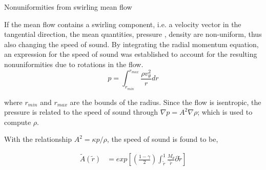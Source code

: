 \begin{frame}{Nonuniformities from swirling mean flow}
    

If the mean flow contains a swirling component, i.e. a velocity vector in the 
tangential direction, the mean quantities, pressure , density are non-uniform, 
thus also changing the speed of sound. By integrating the radial momentum
equation, an expression for the speed of sound was established to account for 
the resulting nonuniformities due to rotations in the flow. 
\begin{equation}
    p = \int_{r_{min}}^{r_{max}} \frac{\rho v_{\theta}^2}{r} dr 
    \label{eqn:radialmomentum_integrated}
\end{equation}

where $r_{min}$ and $r_{max}$ are the bounds of the radius. Since the flow
is isentropic, the pressure is related to the speed of sound through $\nabla p =
A^2 \nabla \rho$; which is used to compute $\rho$. 

\end{frame}
\begin{frame}

With the relationship 
$A^2 = \kappa p/\rho$, the speed of sound is found to be,

    
\begin{align*}
\tilde{A}(\tilde{r}) &= exp\left[\left(\frac{1 - \gamma}{2}\right)\int_{\tilde{r}}^{1}\frac{M_{\theta}}{\tilde{r}}{\partial \tilde{r}}\right]	
\end{align*}

\end{frame}
\begin{frame}

    
\end{frame}
